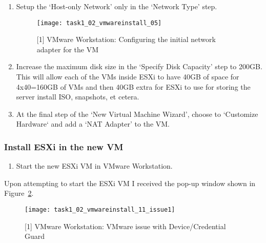 \begin{enumerate}[resume*=task1methodology]
\begin{enumerate}[label=(\alph*)]
      \item Setup the `Host-only Network' only in the `Network Type' step.
        \begin{figure}[H]
          \centering
          \captionsetup{skip=2pt}
          \texttt{[image: task1\_02\_vmwareinstall\_05]}
          \caption{[1] VMware Workstation: Configuring the initial network adapter for the VM}
          \label{fig:task1:02_vmwarewiz_05}
        \end{figure}
      \item Increase the maximum disk size in the `Specify Disk Capacity' step to 200GB. This will allow each of the VMs inside ESXi to have 40GB of space for 4x40=160GB of VMs and then 40GB extra for ESXi to use for storing the server install ISO, snapshots, et cetera.
      \item At the final step of the `New Virtual Machine Wizard', choose to `Customize Hardware` and add a `NAT Adapter' to the VM.
    \end{enumerate}
\end{enumerate}

\subsubsection{Install ESXi in the new VM}
\begin{enumerate}[resume*=task1methodology]
  \item Start the new ESXi VM in VMware Workstation.
\end{enumerate}

\noindent Upon attempting to start the ESXi VM I received the pop-up window shown in Figure~\ref{fig:task1:02_vmwarewiz_11_issue}.

\begin{figure}[H]
  \centering
  \captionsetup{skip=2pt}
  \texttt{[image: task1\_02\_vmwareinstall\_11\_issue1]}
  \caption{[1] VMware Workstation: VMware issue with Device/Credential Guard}
  \label{fig:task1:02_vmwarewiz_11_issue}
\end{figure}

